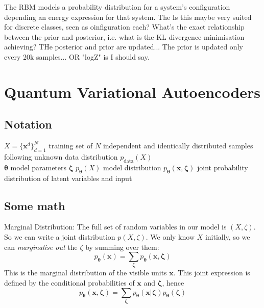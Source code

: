 The RBM models a probability distribution for a system's configuration depending
an energy expression for that system. The Is this maybe very suited for discrete
classes, seen as oinfiguration each? What's the exact relationship between the
prior and posterior, i.e. what is the KL divergence minimisation achieving? THe
posterior and prior are updated... The prior is updated only every 20k
samples... OR "logZ" is I should say. 



\section{Quantum Variational Autoencoders}

\newcommand{\beq}{\begin{equation}}
\newcommand{\eeq}{\end{equation}}
\newcommand{\bea}{\begin{eqnarray}}
\newcommand{\eea}{\end{eqnarray}}
\newcommand{\nn}{\nonumber \\}
\newcommand{\E}{\mathbb{E}}
\newcommand{\Ham}{\mathcal{H}}
\newcommand{\z}{\mathcal{\bzeta}}
\renewcommand{\bf}{\mathbf}
\def\pd{\partial} 
\def\ph{\phantom{\hspace{1cm}}}
\def\x{\mathbf{x}}
\def\z{\mathbf{z}}
\def\bzeta{\bm{\zeta}}
\def\btheta{{\bm{\theta}}}
\def\bepsilon{{\bm{\rho}}}
\def\brho{{\bm{\rho}}}
\def\bphi{{\bm{\phi}}}
\def\p{\partial}
\def\tr{\text{Tr}}
\def\Ex{\mathbb{E}_{\x \sim p_\text{data}}}

\subsection{Notation}
$X = \{  \x^{d}\}_{d=1}^N$ training set of $N$ independent and
identically distributed samples following unknown data distribution
$p_\text{data}(X)$\\
$\btheta$ model parameters
$\bzeta$
$p_\btheta(X)$ model distribution
$p_{\btheta}(\x, \bzeta)$ joint probability distribution of latent variables and
input


\subsection{Some math}
Marginal Distribution: The full set of random variables in our model is
$(X,\zeta)$. So we can write a joint distribution $p(X,\zeta)$. We only know $X$
initially, so we can \emph{marginalise out} the $\zeta$ by summing over them:
\beq
 p_{\btheta} (\x) = \sum_{\bzeta}  p_{\btheta} (\x,\bzeta)
\eeq
This is the marginal distribution of the visible units $\x$. This joint
expression is defined by the conditional probabilities of $\x$ and $\bzeta$, hence 
\beq
p_{\btheta} (\x,\bzeta)= \sum_{\bzeta} p_{\btheta} (\x|\bzeta)p_{\btheta}(\bzeta)
\eeq

